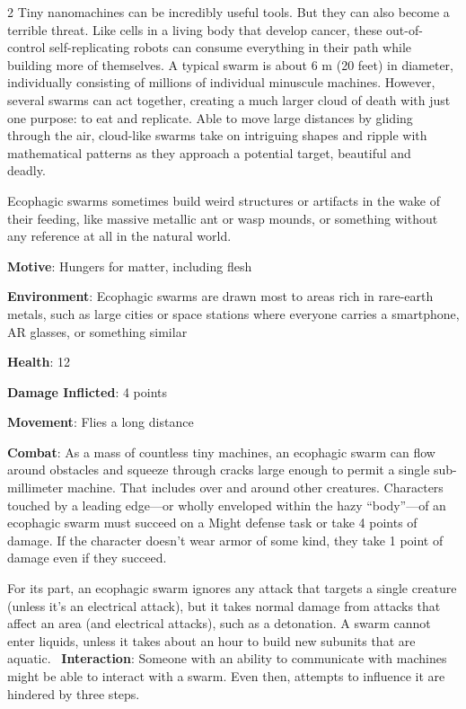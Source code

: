 \begin{multicols}{2}
Tiny nanomachines can be incredibly useful tools. But they can also become a terrible threat. Like cells in a living body that develop cancer, these out-of-control self-replicating robots can consume everything in their path while building more of themselves. A typical swarm is about 6 m (20 feet) in diameter, individually consisting of millions of individual minuscule machines. However, several swarms can act together, creating a much larger cloud of death with just one purpose: to eat and replicate. Able to move large distances by gliding through the air, cloud-like swarms take on intriguing shapes and ripple with mathematical patterns as they approach a potential target, beautiful and deadly. 

Ecophagic swarms sometimes build weird structures or artifacts in the wake of their feeding, like massive metallic ant or wasp mounds, or something without any reference at all in the natural world.

\textbf{Motive}: Hungers for matter, including flesh 

\textbf{Environment}: Ecophagic swarms are drawn most to areas rich in rare-earth metals, such as large cities or space stations where everyone carries a smartphone, AR glasses, or something similar 

\textbf{Health}: 12 

\textbf{Damage Inflicted}:  4 points 

\textbf{Movement}: Flies a long distance 

\textbf{Combat}: As a mass of countless tiny machines, an ecophagic swarm can flow around obstacles and squeeze through cracks large enough to permit a single sub-millimeter machine. That includes over and around other creatures. Characters touched by a leading edge—or wholly enveloped within the hazy “body”—of an ecophagic swarm must succeed on a Might defense task or take 4 points of damage. If the character doesn’t wear armor of some kind, they take 1 point of damage even if they succeed. 

For its part, an ecophagic swarm ignores any attack that targets a single creature (unless it’s an electrical attack), but it takes normal damage from attacks that affect an area (and electrical attacks), such as a detonation. A swarm cannot enter liquids, unless it takes about an hour to build new subunits that are aquatic. 
\textbf{Interaction}: Someone with an ability to communicate with machines might be able to interact with a swarm. Even then, attempts to influence it are hindered by three steps. 


\end{multicols}
